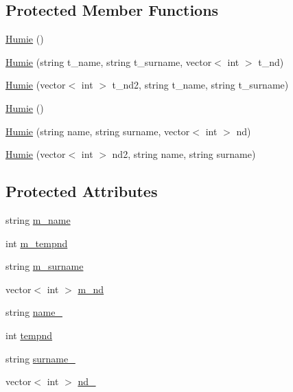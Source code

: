 \subsection*{Protected Member Functions}
\begin{DoxyCompactItemize}
\item 
\mbox{\hyperlink{class_humie_a9a042aaece31359fe6fed36471e6c45a}{Humie}} ()
\item 
\mbox{\hyperlink{class_humie_aaf022723e87d5b942b75ac0f3886040f}{Humie}} (string t\+\_\+name, string t\+\_\+surname, vector$<$ int $>$ t\+\_\+nd)
\item 
\mbox{\hyperlink{class_humie_a81c0810d76013148334772fbcaceaf93}{Humie}} (vector$<$ int $>$ t\+\_\+nd2, string t\+\_\+name, string t\+\_\+surname)
\item 
\mbox{\hyperlink{class_humie_a9a042aaece31359fe6fed36471e6c45a}{Humie}} ()
\item 
\mbox{\hyperlink{class_humie_a967215f261774cb74388be0134186a15}{Humie}} (string name, string surname, vector$<$ int $>$ nd)
\item 
\mbox{\hyperlink{class_humie_af7aee344bf24bb787e59eeaae287c228}{Humie}} (vector$<$ int $>$ nd2, string name, string surname)
\end{DoxyCompactItemize}
\subsection*{Protected Attributes}
\begin{DoxyCompactItemize}
\item 
string \mbox{\hyperlink{class_humie_ad1721cb953022792ff05eadc1b18bd13}{m\+\_\+name}}
\item 
int \mbox{\hyperlink{class_humie_ab8dcd72d3da064284d0628271783771b}{m\+\_\+tempnd}}
\item 
string \mbox{\hyperlink{class_humie_a2ff317d172dd031ad358edaf6971afb2}{m\+\_\+surname}}
\item 
vector$<$ int $>$ \mbox{\hyperlink{class_humie_ad1f9a0feba7e326695739192f6f317fb}{m\+\_\+nd}}
\item 
string \mbox{\hyperlink{class_humie_a72becbf27ee1bea41f9e2b4084a001c6}{name\+\_\+}}
\item 
int \mbox{\hyperlink{class_humie_a5c8fe9c666790c1d3ea65a96a90cfa31}{tempnd}}
\item 
string \mbox{\hyperlink{class_humie_a2c9c318aa4e8bb5a0c60f4263291961d}{surname\+\_\+}}
\item 
vector$<$ int $>$ \mbox{\hyperlink{class_humie_a9fb644c20dd87fedac9a29eac85f1c05}{nd\+\_\+}}
\end{DoxyCompactItemize}


